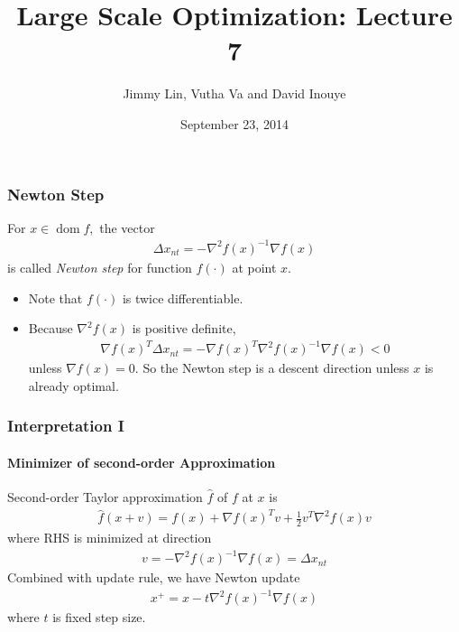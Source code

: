 \documentclass{beamer}
\title{Large Scale Optimization: Lecture 7}
\author{Jimmy Lin, Vutha Va and David Inouye}
\institute[]{The University of Texas at Austin}
\date{September 23, 2014}
\DeclareMathOperator{\dom}{dom}
\begin{document}
\begin{frame}
\titlepage
\end{frame}

\begin{frame}
\frametitle{Newton Step}
\begin{definition}
    For $x \in \dom f,$ the vector 
    \begin{align}
        \Delta x_{nt} = - \nabla^2 f(x)^{-1} \nabla f(x)
    \end{align}
    is called {\it Newton step} for function $f(\cdot)$ at point $x$. 
\end{definition}
\begin{itemize}
\item Note that $f(\cdot)$ is twice differentiable. 

\item Because $\nabla^2 f(x)$ is positive definite, 
    \begin{align}
        \nabla f(x)^T \Delta x_{nt} = -\nabla f(x)^T \nabla^2 f(x)^{-1} \nabla f(x) < 0
    \end{align}
unless $\nabla f(x) = 0$. So the Newton step is a descent direction unless $x$ is
already optimal.
\end{itemize}
\end{frame}
\begin{frame}
\frametitle{Interpretation I}
\framesubtitle{Minimizer of second-order Approximation}
    Second-order Taylor approximation $\hat{f}$ of $f$ at $x$ is
    \begin{align}
    \hat{f}(x+v) = f(x) + \nabla f(x)^T v + \frac{1}{2} v^T \nabla^2 f(x) v
    \end{align}
    where RHS is minimized at direction
    \begin{align}
        v = - \nabla^2 f(x)^{-1} \nabla f(x) = \Delta x_{nt} 
    \end{align}
Combined with update rule, we have Newton update
    \begin{align}
    x^{+} = x - t \nabla^2 f(x)^{-1} \nabla f(x)
    \end{align}
    where $t$ is fixed step size.
\end{frame}
\end{document}
